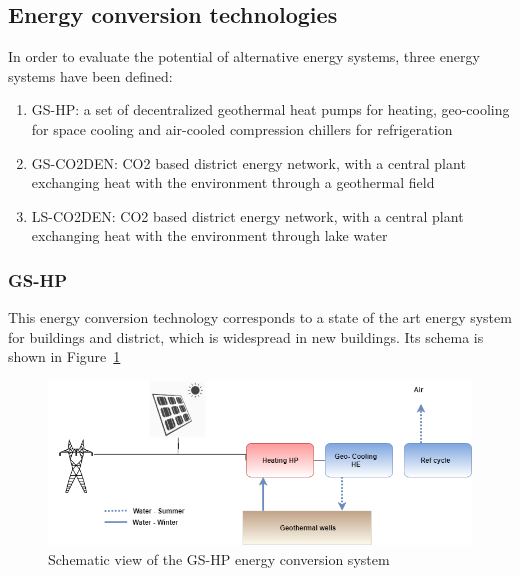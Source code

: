 \documentclass{article}
\begin{document}
%



\subsection{Energy conversion technologies}

In order to evaluate the potential of alternative energy systems, three energy systems have been defined:
\begin{enumerate}
	\item GS-HP: a set of decentralized geothermal heat pumps for heating, geo-cooling for space cooling and air-cooled compression chillers for refrigeration
	\item GS-CO2DEN: CO2 based district energy network, with a central plant exchanging heat with the environment through a geothermal field
	\item LS-CO2DEN: CO2 based district energy network, with a central plant exchanging heat with the environment through lake water
\end{enumerate}

\subsubsection{GS-HP}
This energy conversion technology corresponds to a state of the art energy system for buildings and district, which is widespread in new buildings. Its schema is shown in Figure~\ref{fig:energyschemaref}

\begin{figure}[tph]
	\centering
	\includegraphics[width=1\linewidth]{Images/energy_schema_ref}
	\caption{Schematic view of the GS-HP energy conversion system}
	\label{fig:energyschemaref}
\end{figure}
\end{document}
